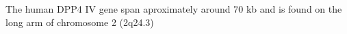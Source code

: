 The human DPP4 IV gene span aproximately around 70 kb and is found on the long arm of chromosome 2 (2q24.3)